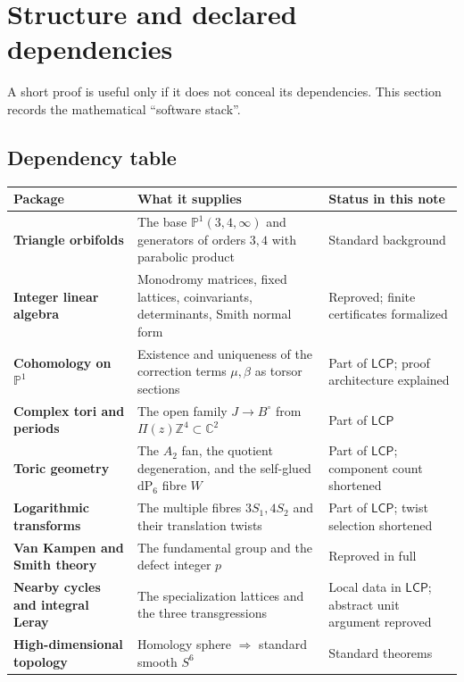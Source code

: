 \documentclass[11pt,reqno]{amsart}
\numberwithin{equation}{section}
\newcommand{\Z}{\mathbb Z}
\newcommand{\C}{\mathbb C}
\newcommand{\Pone}{\mathbb P^1}
\newcommand{\dP}{\mathrm{dP}_6}
\newcommand{\LCP}{\mathsf{LCP}}
\theoremstyle{definition}
\begin{document}
\section{Structure and declared dependencies}\label{sec:dependencies}

A short proof is useful only if it does not conceal its dependencies. This section records the mathematical ``software stack''.

\subsection{Dependency table}

\begin{center}
\small
\begin{tabularx}{\textwidth}{@{}>{\raggedright\arraybackslash\bfseries}p{}X>{\raggedright\arraybackslash}p{}@{}}
\toprule
Package & What it supplies & Status in this note\\
\midrule
Triangle orbifolds & The base $\Pone(3,4,\infty)$ and generators of orders $3,4$ with parabolic product & Standard background\\
Integer linear algebra & Monodromy matrices, fixed lattices, coinvariants, determinants, Smith normal form & Reproved; finite certificates formalized\\
Cohomology on $\Pone$ & Existence and uniqueness of the correction terms $\mu,\beta$ as torsor sections & Part of $\LCP$; proof architecture explained\\
Complex tori and periods & The open family $J\to B^\circ$ from $\Pi(z)\Z^4\subset\C^2$ & Part of $\LCP$\\
Toric geometry & The $A_2$ fan, the quotient degeneration, and the self-glued $\dP$ fibre $W$ & Part of $\LCP$; component count shortened\\
Logarithmic transforms & The multiple fibres $3S_1,4S_2$ and their translation twists & Part of $\LCP$; twist selection shortened\\
Van Kampen and Smith theory & The fundamental group and the defect integer $p$ & Reproved in full\\
Nearby cycles and integral Leray & The specialization lattices and the three transgressions & Local data in $\LCP$; abstract unit argument reproved\\
High-dimensional topology & Homology sphere $\Rightarrow$ standard smooth $S^6$ & Standard theorems\\
\bottomrule
\end{tabularx}
\end{center}
\end{document}
